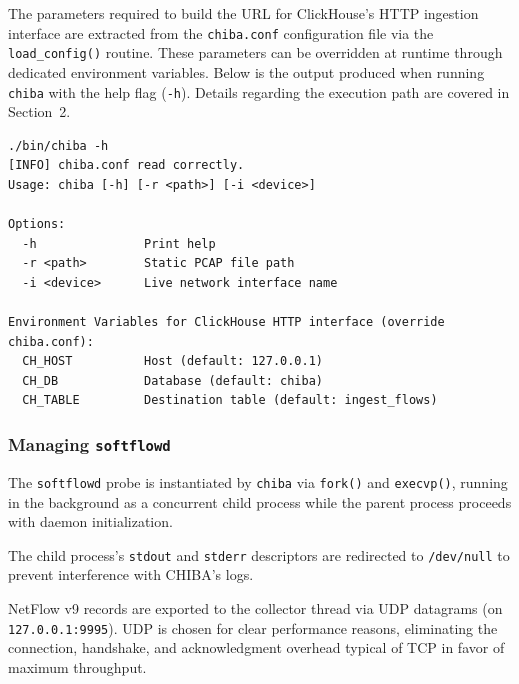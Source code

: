 \documentclass[11pt,a4paper]{article}
\newenvironment{codebox}[1][]{%
    \begin{tcolorbox}[
        colback=codebg,
        colframe=codeframe,
        boxrule=0.6pt,
        arc=1.5mm,
        left=3mm,
        right=3mm,
        top=2mm,
        bottom=2mm,
        fonttitle=\sffamily\bfseries\footnotesize,
        coltitle=chibadark,
        colbacktitle=codeframe!50!white,
        #1
    ]
}{%
    \end{tcolorbox}
}
\begin{document}
The parameters required to build the URL for ClickHouse's HTTP ingestion interface are extracted from the \texttt{chiba.conf} configuration file via the \texttt{load\_config()} routine. These parameters can be overridden at runtime through dedicated environment variables. Below is the output produced when running \texttt{chiba} with the help flag (\texttt{-h}). Details regarding the execution path are covered in Section~2.

\begin{codebox}[title={CLI Help Output}]
\footnotesize
\begin{verbatim}
./bin/chiba -h
[INFO] chiba.conf read correctly.
Usage: chiba [-h] [-r <path>] [-i <device>]

Options:
  -h               Print help
  -r <path>        Static PCAP file path
  -i <device>      Live network interface name

Environment Variables for ClickHouse HTTP interface (override chiba.conf):
  CH_HOST          Host (default: 127.0.0.1)
  CH_DB            Database (default: chiba)
  CH_TABLE         Destination table (default: ingest_flows)
\end{verbatim}
\end{codebox}

\subsubsection{Managing \texttt{softflowd}}
The \texttt{softflowd} probe is instantiated by \texttt{chiba} via \texttt{fork()} and \texttt{execvp()}, running in the background as a concurrent child process while the parent process proceeds with daemon initialization.

The child process's \texttt{stdout} and \texttt{stderr} descriptors are redirected to \texttt{/dev/null} to prevent interference with CHIBA's logs.

NetFlow v9 records are exported to the collector thread via UDP datagrams (on \texttt{127.0.0.1:9995}). UDP is chosen for clear performance reasons, eliminating the connection, handshake, and acknowledgment overhead typical of TCP in favor of maximum throughput.
\end{document}
